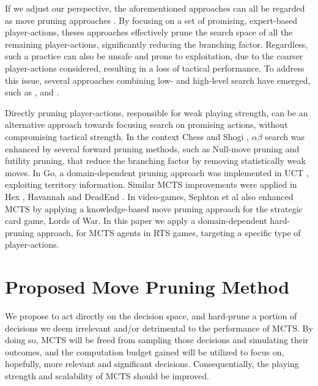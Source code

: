 \documentclass[conference]{IEEEtran}
\begin{document}

If we adjust our perspective, the aforementioned approaches can all be regarded as move pruning approaches \cite{yang_integrating_2020}. By focusing on a set of promising, expert-based player-actions, theses approaches effectively prune the search space of all the remaining player-actions, significantly reducing the branching factor. Regardless, such a practice can also be unsafe and prone to exploitation, due to the coarser player-actions considered, resulting in a loss of tactical performance. To address this issue, several approaches combining low- and high-level search have emerged, such as \cite{barriga_combining_2017}, \cite{neufeld_hybrid_2019} and \cite{moraes_action_2018}.

Directly pruning player-actions, responsible for weak playing strength, can be an alternative approach towards focusing search on promising actions, without compromising tactical strength. In the context Chess \cite{heinz_adaptive_1999} and Shogi \cite{hoki_efficiency_2012}, $\alpha\beta$ search was enhanced by several forward pruning methods, such as Null-move pruning and futility pruning, that reduce the branching factor by removing statistically weak moves. In Go, a domain-dependent pruning approach was implemented in UCT \cite{huang_pruning_2010-1}, exploiting territory information. Similar MCTS improvements were applied in Hex \cite{arneson_monte_2010-1}, Havannah \cite{dugueperoux_pruning_2016} and DeadEnd \cite{he_game_2008-1}. In video-games, Sephton et al \cite{sephton_heuristic_2014} also enhanced MCTS by applying a knowledge-based move pruning approach for the strategic card game, Lords of War. In this paper we apply a domain-dependent hard-pruning approach, for MCTS agents in RTS games, targeting a specific type of player-actions.



\section{Proposed Move Pruning Method}
\label{sec:proposed_method}

We propose to act directly on the decision space, and hard-prune a portion of decisions we deem irrelevant and/or detrimental to the performance of MCTS. By doing so, MCTS will be freed from sampling those decisions and simulating their outcomes, and the computation budget gained will be utilized to focus on, hopefully, more relevant and significant decisions. Consequentially, the playing strength and scalability of MCTS should be improved.
\end{document}
